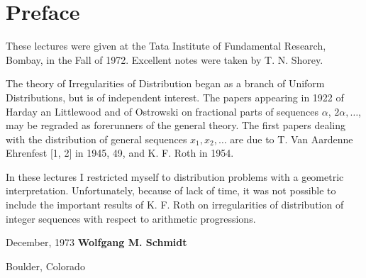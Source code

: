 \chapter{Preface}


These lectures were given at the Tata Institute of Fundamental
Research, Bombay, in the Fall of 1972. Excellent notes were taken by
T. N. Shorey. 

The theory of Irregularities of Distribution began as a branch of
Uniform Distributions, but is of independent interest. The papers
appearing in 1922 of Harday an Littlewood \cite{8} and of Ostrowski
\cite{16} on fractional parts of sequences $\alpha$, $2 \alpha,
\ldots$, may be regraded as forerunners of the general theory. The
first papers dealing with the distribution of general sequences $x_1,
x_2, \ldots$ are due to T. Van Aardenne Ehrenfest [1, 2] in 1945, 49,
and K. F. Roth \cite{19} in 1954. 

In these lectures I restricted myself to distribution problems with a
geometric interpretation. Unfortunately, because of lack of time, it
was not possible to include the important results of K. F. Roth on
irregularities of distribution of integer sequences with respect to
arithmetic progressions.  

\vskip 2cm
\noindent December, 1973 \hfill {\large\bf Wolfgang M. Schmidt}

\hfill Boulder, Colorado
 
